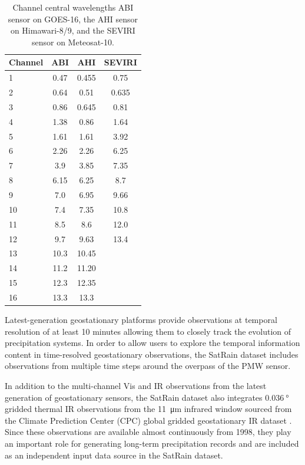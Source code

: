 \documentclass[11pt]{article}
\begin{document}
\begin{table}[htbp]
  \centering
	\caption{Channel central wavelengths ABI sensor on GOES-16, the AHI sensor on Himawari-8/9, and the SEVIRI sensor on Meteosat-10.}
	\label{tab:geo_channels}
    \begin{tabular}{lccc}
      \toprule
      Channel & ABI & AHI & SEVIRI \\
      \midrule
      1 & 0.47 & 0.455 & 0.75  \\
      2 & 0.64 & 0.51  & 0.635 \\
      3 & 0.86 & 0.645 & 0.81  \\
      4 & 1.38 & 0.86  & 1.64  \\
      5 & 1.61 & 1.61  & 3.92  \\
      6 & 2.26 & 2.26  & 6.25  \\
      7 & 3.9  & 3.85  & 7.35  \\
      8 & 6.15 & 6.25  & 8.7   \\
      9 & 7.0  & 6.95  & 9.66  \\
      10 & 7.4  & 7.35  & 10.8 \\
      11 & 8.5  & 8.6   & 12.0 \\
      12 & 9.7  & 9.63  & 13.4 \\
      13 & 10.3 & 10.45 &    \\
      14 & 11.2 & 11.20 &    \\
      15 & 12.3 & 12.35 &    \\
      16 & 13.3 & 13.3  &    \\
      \bottomrule
	\end{tabular}
\end{table}

Latest-generation geostationary platforms provide observations at temporal
resolution of at least 10 minutes allowing them to closely track the evolution of
precipitation systems. In order to allow users to explore the temporal
information content in time-resolved geostationary observations, the SatRain
dataset includes observations from multiple time steps around the overpass of
the PMW sensor.

In addition to the multi-channel Vis and IR observations from the latest
generation of geostationary sensors, the SatRain dataset also integrates
$\SI{0.036}{\degree}$ gridded thermal IR observations from the \SI{11}{\micro \meter}
infrared window sourced from the Climate Prediction Center (CPC) global gridded
geostationary IR dataset \citep{NCEP_CPC_L3_IR}. Since these observations are
available almost continuously from 1998, they play an important role for
generating long-term precipitation records and are included as an independent
input data source in the SatRain dataset.
\end{document}
